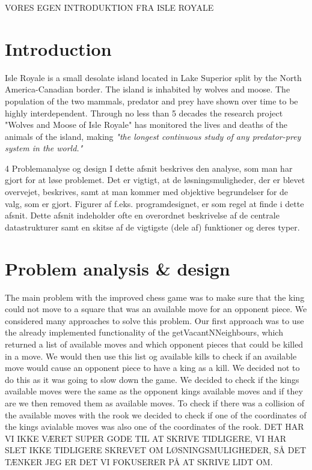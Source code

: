 \documentclass[a4paper]{report}
\begin{document}
VORES EGEN INTRODUKTION FRA ISLE ROYALE 
\section*{Introduction}
Isle Royale is a small desolate island located in Lake Superior split by the North America-Canadian border. The island is inhabited by wolves and moose. The population of the two mammals, predator and prey have shown over time to be highly interdependent.
Through no less than 5 decades the research project "Wolves and Moose of Isle Royale" has monitored the lives and deaths of the animals of the island, making \textit{"the longest continuous study of any predator-prey system in the world."}

4 Problemanalyse og design
I dette afsnit beskrives den analyse, som man har gjort for at løse problemet. Det er vigtigt, at de
løsningsmuligheder, der er blevet overvejet, beskrives, samt at man kommer med objektive begrundelser
for de valg, som er gjort. Figurer af f.eks. programdesignet, er som regel at finde i dette afsnit. Dette
afsnit indeholder ofte en overordnet beskrivelse af de centrale datastrukturer samt en skitse af de vigtigste
(dele af) funktioner og deres typer.

\section*{Problem analysis \& design}
The main problem with the improved chess game was to make sure that the king could not move to a square that was an available move for an opponent piece. We considered many approaches to solve this problem.
Our first approach was to use the already implemented functionality of the getVacantNNeighbours, which returned a list of available moves and which opponent pieces that could be killed in a move. We
would then use this list og available kills to check if an available move would cause an opponent piece to have a king as a kill. We decided not to do this as it was going to slow down the game. We decided to
check if the kings available moves were the same as the opponent kings available moves and if they are we then removed them as available moves. To check if there was a collision of the available moves with the rook we
decided to check if one of the coordinates of the kings avialable moves was also one of the coordinates of the rook.
DET HAR VI IKKE VÆRET SUPER GODE TIL AT SKRIVE TIDLIGERE, VI HAR SLET IKKE TIDLIGERE SKREVET OM LØSNINGSMULIGHEDER, SÅ DET TÆNKER JEG ER DET VI FOKUSERER PÅ AT SKRIVE LIDT OM.
\end{document}
